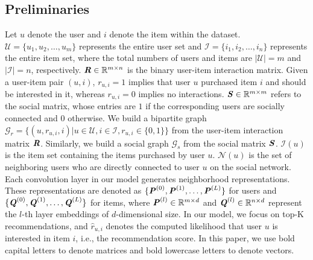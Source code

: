 \documentclass[letterpaper]{article} %
\begin{document}
\subsection{Preliminaries}
Let $u$ denote the user and $i$ denote the item within the dataset. $\mathcal{U}=\{u_1,  u_2, \ldots, u_m\}$ represents the entire user set and $\mathcal{I}=\{i_1, i_2, \ldots, i_n\}$ represents the entire item set, where the total numbers of users and items are $|\mathcal{U}|=m$ and $|\mathcal{I}|=n$, respectively. $\textbf{\textit{R}} \in \mathbb{R}^{m\times n}$ is the binary user-item interaction matrix. Given a user-item pair $(u, i)$, $r_{u,i}=1$ implies that user $u$ purchased item $i$ and should be interested in it, whereas $r_{u,i}=0$ implies no interactions. $\textbf{\textit{S}} \in \mathbb{R}^{m\times m}$ refers to the social matrix, whose entries are $1$ if the corresponding users are socially connected and $0$ otherwise. We build a bipartite graph $\mathcal{G}_r=\{(u, r_{u,i}, i)|u\in \mathcal{U}, i\in \mathcal{I}, r_{u,i}\in \{0,1\}\}$ from the user-item interaction matrix $\textbf{\textit{R}}$. Similarly, we build a social graph $\mathcal{G}_s$ from the social matrix $\textbf{\textit{S}}$. $\mathcal{I}(u)$ is the item set containing the items purchased by user $u$. $\mathcal{N}(u)$ is the set of neighboring users who are directly connected to user $u$ on the social network. Each convolution layer in our model generates neighborhood representations. These representations are denoted as $\{\textbf{\textit{P}}^{(0)}, \textbf{\textit{P}}^{(1)}, \ldots, \textbf{\textit{P}}^{(L)}\}$ for users and $\{\textbf{\textit{Q}}^{(0)}, \textbf{\textit{Q}}^{(1)}, \ldots, \textbf{\textit{Q}}^{(L)}\}$ for items, where $\textbf{\textit{P}}^{(l)} \in \mathbb{R}^{m\times d}$ and $\textbf{\textit{Q}}^{(l)} \in \mathbb{R}^{n\times d}$ represent the $l$-th layer embeddings of $d$-dimensional size. In our model, we focus on top-K recommendations, and $\hat{r}_{u, i}$ denotes the computed likelihood that user $u$ is interested in item $i$, i.e., the recommendation score. In this paper, we use bold capital letters to denote matrices and bold lowercase letters to denote vectors.
\end{document}
